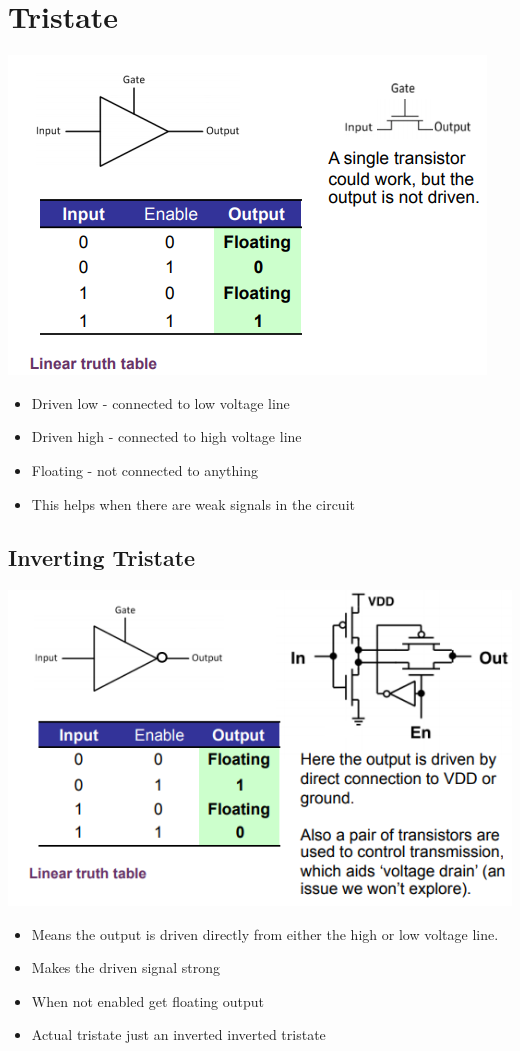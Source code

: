\documentclass{article}[18pt]
\begin{document}
\section{Tristate}
\begin{center}
	\includegraphics[scale=0.7]{tristate}
\end{center}
\begin{itemize}
	\item Driven low - connected to low voltage line
	\item Driven high - connected to high voltage line
	\item Floating - not connected to anything
	\item This helps when there are weak signals in the circuit
\end{itemize}

\subsection{Inverting Tristate}
\begin{center}
	\includegraphics[scale=0.7]{inverting_tristate}
\end{center}
\begin{itemize}
	\item Means the output is driven directly from either the high or low voltage line.
	\item Makes the driven signal strong
	\item When not enabled get floating output
	\item Actual tristate just an inverted inverted tristate
\end{itemize}
\end{document}
